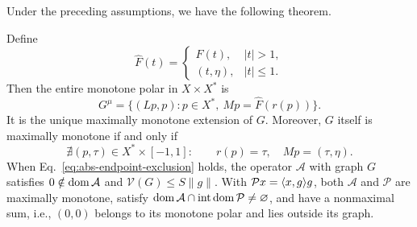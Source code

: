 Under the preceding assumptions, we have the following theorem. 

\begin{theorem}
\label{thm:endpoint-criterion}
Define
\[
\widehat F(t)=
\begin{cases}
F(t),&|t|>1,\\
(t,\eta),&|t|\le1.
\end{cases}
\]
Then the entire monotone polar in $X\times X^*$ is
\begin{equation}
G^\mu=\{(Lp,p):p\in X^*,\ Mp=\widehat F(r(p))\}.
\label{eq:abs-entire-polar}
\end{equation}
It is the unique maximally monotone extension of $G$. Moreover, $G$
itself is maximally monotone if and only if
\begin{equation}
\nexists(p,\tau)\in X^*\times[-1,1]:
\qquad r(p)=\tau,\quad Mp=(\tau,\eta).
\label{eq:abs-endpoint-exclusion}
\end{equation}
When Eq.~\eqref{eq:abs-endpoint-exclusion} holds, the operator
$\mathcal A$ with graph $G$ satisfies $0\notin\operatorname{dom}\mathcal A$ and
$\mathcal V(G)\le S\|g\|$. With
$\mathcal P x=\langle x,g\rangle g$, both $\mathcal A$ and $\mathcal P$
are maximally monotone, satisfy
$\operatorname{dom}\mathcal A\cap\operatorname{int}\operatorname{dom}\mathcal P\ne\varnothing$,
and have a nonmaximal sum, i.e., $(0,0)$ belongs to its monotone polar
and lies outside its graph.
\end{theorem}
